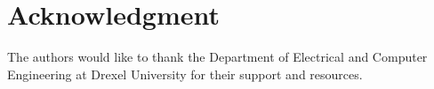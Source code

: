\documentclass[conference]{IEEEtran}
\begin{document}
\section*{Acknowledgment}
The authors would like to thank the Department of Electrical and Computer Engineering at Drexel University for their support and resources.



\end{document}
